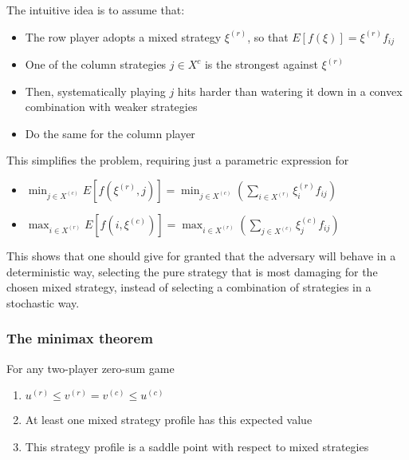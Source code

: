 The intuitive idea is to assume that:
\begin{itemize}
	\item The row player adopts a mixed strategy $\xi^{(r)}$, so that $E\left[f(\xi)\right] = \xi^{(r)} f_{ij}$
	
	\item One of the column strategies $j \in X^c$ is the strongest against $\xi^{(r)}$
	
	\item Then, systematically playing $j$ hits harder than watering it down in a convex combination with weaker strategies
	
	\item Do the same for the column player
\end{itemize}

This simplifies the problem, requiring just a parametric expression for
\begin{itemize}
	\item $\min_{j \in X^{(c)}} E \left[f(\xi^{(r)}, j)\right] = \min_{j \in X^{(c)}} \left(\sum_{i \in X^{(r)}} \xi^{(r)}_i f_{ij} \right)$
	
	\item $\max_{i \in X^{(r)}} E \left[f(i, \xi^{(c)})\right] = \max_{i \in X^{(r)}} \left(\sum_{j \in X^{(c)}} \xi^{(c)}_j f_{ij}\right)$
\end{itemize}

This shows that one should give for granted that the adversary will behave in a deterministic way, selecting the pure strategy that is most damaging for the chosen mixed strategy, instead of selecting a combination of strategies in a stochastic way. 

\subsubsection{The minimax theorem}

\begin{theo}
	For any two-player zero-sum game
	\begin{enumerate}
		\item $u^{(r)} \leq v^{(r)} = v^{(c)} \leq u^{(c)}$
		
		\item At least one mixed strategy profile has this expected value
		
		\item This strategy profile is a saddle point with respect to mixed strategies
	\end{enumerate}
\end{theo}

